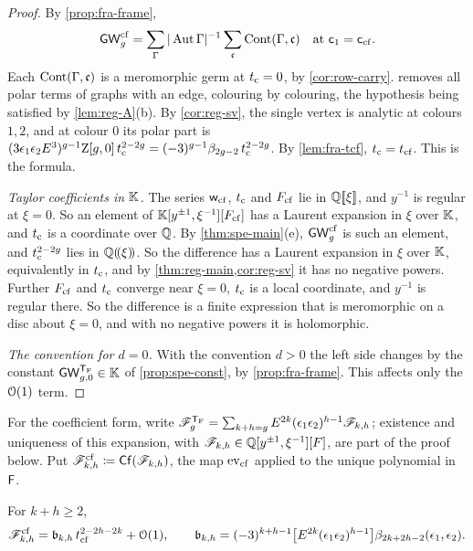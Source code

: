 \begin{proof}
By \cref{prop:fra-frame},
\[
\mathsf{GW}^{\mathrm{cf}}_g=\sum_\Gamma|\operatorname{Aut}\Gamma|^{-1}\sum_{\mathfrak{c}}\mathrm{Cont}(\Gamma,\mathfrak{c})\quad\text{at }\mathsf{c}_{1}=\mathsf{c}_{\mathrm{cf}}.
\]
Each $\mathrm{Cont}(\Gamma,\mathfrak{c})$ is a meromorphic germ at $t_{\mathrm{c}}=0$, by \cref{cor:row-carry}.  removes all polar terms of graphs with an edge, colouring by colouring, the hypothesis being satisfied by \cref{lem:reg-A}(b). By \cref{cor:reg-sv}, the single vertex is analytic at colours $1,2$, and at colour $0$ its polar part is $(3\epsilon_1\epsilon_2E^3)^{g-1}\mathrm{Z}[g,0]\,t_{\mathrm{c}}^{2-2g}=(-3)^{g-1}\beta_{2g-2}\,t_{\mathrm{c}}^{2-2g}$. By \cref{lem:fra-tcf}, $t_{\mathrm{c}}=t_{\mathrm{cf}}$. This is the formula.

\emph{Taylor coefficients in $\mathbb{K}$.} The series $\mathsf{w}_{\mathrm{cf}}$, $t_{\mathrm{c}}$ and $F_{\mathrm{cf}}$ lie in $\mathbb{Q}[\![ \xi ]\!]$, and $y^{-1}$ is regular at $\xi=0$. So an element of $\mathbb{K}[y^{\pm1},\xi^{-1}][F_{\mathrm{cf}}]$ has a Laurent expansion in $\xi$ over $\mathbb{K}$, and $t_{\mathrm{c}}$ is a coordinate over $\mathbb{Q}$. By \cref{thm:spe-main}(e), $\mathsf{GW}^{\mathrm{cf}}_g$ is such an element, and $t_{\mathrm{c}}^{2-2g}$ lies in $\mathbb{Q}(\!(\xi)\!)$. So the difference has a Laurent expansion in $\xi$ over $\mathbb{K}$, equivalently in $t_{\mathrm{c}}$, and by \cref{thm:reg-main,cor:reg-sv} it has no negative powers. Further $F_{\mathrm{cf}}$ and $t_{\mathrm{c}}$ converge near $\xi=0$, $t_{\mathrm{c}}$ is a local coordinate, and $y^{-1}$ is regular there. So the difference is a finite expression that is meromorphic on a disc about $\xi=0$, and with no negative powers it is holomorphic.

\emph{The convention for $d=0$.} With the convention $d>0$ the left side changes by the constant $\mathsf{GW}_{g,0}^{\mathsf{T}_{\mathrm{F}}}\in\mathbb{K}$ of \cref{prop:spe-const}, by \cref{prop:fra-frame}. This affects only the $\mathcal{O}(1)$ term.
\end{proof}

For the coefficient form, write $\mathscr{F}_g^{\mathsf{T}_{\mathrm{F}}}=\sum_{k+h=g}E^{2k}(\epsilon_1\epsilon_2)^{h-1}\mathscr{F}_{k,h}$; existence and uniqueness of this expansion, with $\mathscr{F}_{k,h}\in\mathbb{Q}[y^{\pm1},\xi^{-1}][F]$, are part of the proof below. Put $\mathscr{F}^{\mathrm{cf}}_{k,h}\coloneqq\mathsf{Cf}(\mathscr{F}_{k,h})$, the map $\mathrm{ev}_{\mathrm{cf}}$ applied to the unique polynomial in $\mathsf{F}$.

\begin{cor}[Coefficients]
\label{cor:reg-gapkh}
For $k+h\geq 2$,
\[
\mathscr{F}^{\mathrm{cf}}_{k,h}=\mathfrak{b}_{k,h}\,t_{\mathrm{cf}}^{2-2h-2k}+\mathcal{O}(1),\qquad
\mathfrak{b}_{k,h}=(-3)^{k+h-1}\big[E^{2k}(\epsilon_1\epsilon_2)^{h-1}\big]\beta_{2k+2h-2}(\epsilon_1,\epsilon_2).
\]
\end{cor}

